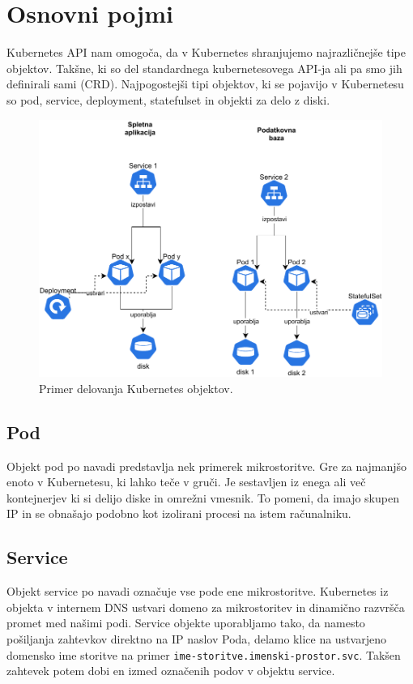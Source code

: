 \documentclass[a4paper, 12pt]{book}
\begin{document}
\section{Osnovni pojmi}
Kubernetes API nam omogoča, da v Kubernetes shranjujemo najrazličnejše tipe objektov.
Takšne, ki so del standardnega kubernetesovega API-ja ali pa smo jih definirali sami (CRD).
Najpogostejši tipi objektov, ki se pojavijo v Kubernetesu so pod, service, deployment, statefulset in objekti za delo z diski.
\begin{figure}[h]
\begin{center}
\includegraphics[width=1.0\textwidth]{images/Kubernetes-simple-schema.pdf}
\end{center}
\caption{Primer delovanja Kubernetes objektov.}
\label{problem-povezanih-clustrov}
\end{figure}
\subsection{Pod~\cite{pod}}
Objekt pod po navadi predstavlja nek primerek mikrostoritve.
Gre za najmanjšo enoto v Kubernetesu, ki lahko teče v gruči.
Je sestavljen iz enega ali več kontejnerjev ki si delijo diske in omrežni vmesnik.
To pomeni, da imajo skupen IP in se obnašajo podobno kot izolirani procesi na istem računalniku.
\subsection{Service~\cite{service}}
Objekt service po navadi označuje vse pode ene mikrostoritve.
Kubernetes iz objekta v internem DNS ustvari domeno za mikrostoritev in dinamično razvršča promet med našimi podi.
Service objekte uporabljamo tako, da namesto pošiljanja zahtevkov direktno na IP naslov Poda, delamo klice na ustvarjeno domensko ime storitve na primer \verb|ime-storitve.imenski-prostor.svc|.
Takšen zahtevek potem dobi en izmed označenih podov v objektu service.
\end{document}
